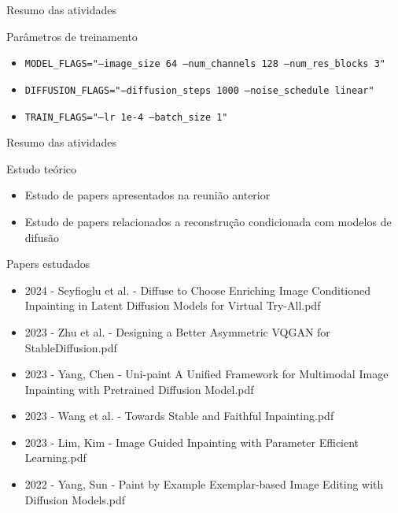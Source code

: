 \documentclass[aspectratio=169]{beamer}
\begin{document}
\begin{frame}{Resumo das atividades}
    \begin{example}{Parâmetros de treinamento}
        \begin{itemize}
            
        
        \item \texttt{MODEL\_FLAGS="--image\_size 64 --num\_channels 128 --num\_res\_blocks 3"}
        \item \texttt{DIFFUSION\_FLAGS="--diffusion\_steps 1000 --noise\_schedule linear"}
        \item \texttt{TRAIN\_FLAGS="--lr 1e-4 --batch\_size 1"}   
        \end{itemize} 
    \end{example}
\end{frame}


\begin{frame}{Resumo das atividades}

    \begin{block}{Estudo teórico}
        \begin{itemize}
            \item Estudo de papers apresentados na reunião anterior
            \item Estudo de papers relacionados a reconstrução condicionada com modelos de difusão
        \end{itemize}
    \end{block}
\end{frame}

\begin{frame}{Papers estudados}
    \begin{itemize}
        \item 2024 - Seyfioglu et al. - Diffuse to Choose Enriching Image Conditioned Inpainting in Latent Diffusion Models for Virtual Try-All.pdf
        \item 2023 - Zhu et al. - Designing a Better Asymmetric VQGAN for StableDiffusion.pdf
        \item 2023 - Yang, Chen - Uni-paint A Unified Framework for Multimodal Image Inpainting with Pretrained Diffusion Model.pdf
        \item 2023 - Wang et al. - Towards Stable and Faithful Inpainting.pdf
        \item 2023 - Lim, Kim - Image Guided Inpainting with Parameter Efficient Learning.pdf
        \item 2022 - Yang, Sun - Paint by Example Exemplar-based Image Editing with Diffusion Models.pdf
    \end{itemize}
    
\end{frame}
\end{document}
